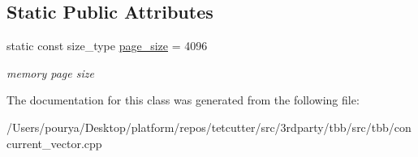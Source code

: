 \subsection*{Static Public Attributes}
\begin{DoxyCompactItemize}
\item 
\hypertarget{classtbb_1_1internal_1_1concurrent__vector__base__v3_1_1helper_ac029c305830edd5f9e0fc59287b25e27}{}static const size\+\_\+type \hyperlink{classtbb_1_1internal_1_1concurrent__vector__base__v3_1_1helper_ac029c305830edd5f9e0fc59287b25e27}{page\+\_\+size} = 4096\label{classtbb_1_1internal_1_1concurrent__vector__base__v3_1_1helper_ac029c305830edd5f9e0fc59287b25e27}

\begin{DoxyCompactList}\small\item\em memory page size \end{DoxyCompactList}\end{DoxyCompactItemize}


The documentation for this class was generated from the following file\+:\begin{DoxyCompactItemize}
\item 
/\+Users/pourya/\+Desktop/platform/repos/tetcutter/src/3rdparty/tbb/src/tbb/concurrent\+\_\+vector.\+cpp\end{DoxyCompactItemize}
